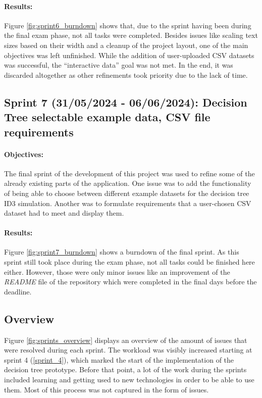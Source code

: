 \paragraph{Results:}
Figure \ref{fig:sprint6_burndown} shows that, due to the sprint having been during the final exam phase, not all tasks were completed. Besides issues like scaling text sizes based on their width and a cleanup of the project layout, one of the main objectives was left unfinished. While the addition of user-uploaded CSV datasets was successful, the ``interactive data'' goal was not met. In the end, it was discarded altogether as other refinements took priority due to the lack of time.

\subsection{Sprint 7 (31/05/2024 - 06/06/2024): Decision Tree selectable example data, CSV file requirements}
\paragraph{Objectives:}
The final sprint of the development of this project was used to refine some of the already existing parts of the application. One issue was to add the functionality of being able to choose between different example datasets for the decision tree ID3 simulation. Another was to formulate requirements that a user-chosen CSV dataset had to meet and display them.

\paragraph{Results:}
Figure \ref{fig:sprint7_burndown} shows a burndown of the final sprint. As this sprint still took place during the exam phase, not all tasks could be finished here either.  However, those were only minor issues like an improvement of the \textit{README} file of the repository which were completed in the final days before the deadline.

\subsection{Overview}
Figure \ref{fig:sprints_overview} displays an overview of the amount of issues that were resolved during each sprint.
The workload was visibly increased starting at sprint 4 (\ref{sprint_4}), which marked the start of the implementation of the decision tree prototype. Before that point, a lot of the work during the sprints included learning and getting used to new technologies in order to be able to use them. Most of this process was not captured in the form of issues. 

